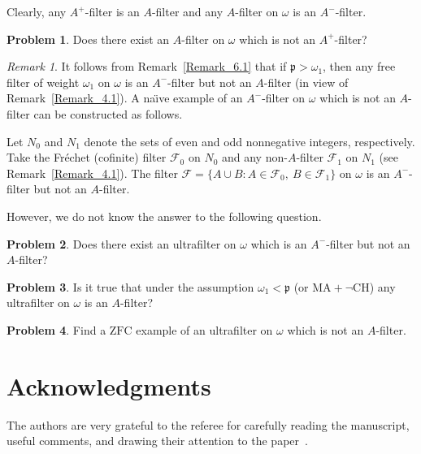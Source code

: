 \documentclass[a4paper,12pt]{amsart}
\theoremstyle{definition}
\newtheorem{problem}{Problem}[section]
\theoremstyle{remark}
\newtheorem{remark}{Remark}[section]
\begin{document}
Clearly, any $A^+$-filter is an $A$-filter and any $A$-filter on $\omega$ is an $A^-$-filter.

\begin{problem}
Does there exist an $A$-filter on $\omega$ which is not an $A^+$-filter?
\end{problem}

\begin{remark}
It follows from Remark~\ref{Remark_6.1} that if $\mathfrak p>\omega_1$, then any free filter of weight $\omega_1$ on 
$\omega$ is an $A^-$-filter but not an $A$-filter (in view of Remark~\ref{Remark_4.1}). A na\"\i ve example of an 
$A^-$-filter on $\omega$ which is not an $A$-filter can be constructed as follows. 

Let $N_0$ and $N_1$ denote the sets of even and odd nonnegative integers, respectively.  
Take the  Fr\' echet (cofinite) filter $\mathscr F_0$ on $N_0$ and any non-$A$-filter $\mathscr F_1$ 
on $N_1$ (see Remark~\ref{Remark_4.1}). The filter $\mathscr F=\{A\cup B:A\in \mathscr F_0,\ B\in \mathscr F_1\}$ on 
$\omega$ is an $A^-$-filter but not an $A$-filter. 
\end{remark}

However, we do not know the answer to the following question. 

\begin{problem}
Does there exist an ultrafilter on $\omega$ which is an $A^-$-filter but not an 
$A$-filter? 
\end{problem}

\begin{problem}
Is it true that under the assumption $\omega_1<\mathfrak p$ (or $\mathrm{MA} + \lnot \mathrm{CH}$) any 
ultrafilter on $\omega$ is an $A$-filter? 
\end{problem}

\begin{problem}
Find a $\mathrm{ZFC}$ example of an ultrafilter on $\omega$ which is not an $A$-filter. 
\end{problem}

\section*{Acknowledgments}
The authors are very grateful to the referee for carefully reading the manuscript, useful comments, and drawing 
their attention to the paper~\cite{HPTZ}.
\end{document}

